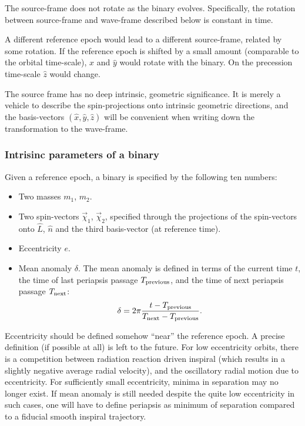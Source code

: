 \documentclass[11pt,tightenlines,article,amssymb,amsmath,amsfonts,superscriptaddress,nofootinbib]{revtex4}
\newcommand{\nNR}{\hat{n}}
\newcommand{\lNR}{\hat L}
\newcommand{\ExS}{{{\hat x}}}
\newcommand{\EyS}{{{\hat y}}}
\newcommand{\EzS}{{{\hat z}}}
\newcommand{\meanAnomaly}{\delta} %
\begin{document}
The source-frame does not rotate as the binary evolves.  Specifically,
the rotation between source-frame and wave-frame described below is
constant in time.

A different reference epoch would lead to a different source-frame,
related by some rotation.  If the reference epoch is shifted by a
small amount (comparable to the orbital time-scale), $\ExS$ and $\EyS$
would rotate with the binary.  On the precession time-scale $\EzS$
would change.


The source frame has no deep intrinsic, geometric significance.  It is
merely a vehicle to describe the spin-projections onto intrinsic
geometric directions, and the basis-vectors $(\ExS, \EyS, \EzS)$ will
be convenient when writing down the transformation to the wave-frame.


\subsubsection{Intrisinc parameters of a binary}

Given a reference epoch, a binary is specified by the following ten
numbers:
\begin{itemize}
\item Two masses $m_1$, $m_2$.
\item Two spin-vectors $\vec\chi_1$, $\vec\chi_2$, specified through 
   the projections of the spin-vectors onto $\lNR$, $\nNR$
  and the third basis-vector (at reference time).
\item Eccentricity $e$.
\item Mean anomaly $\meanAnomaly$.  The mean anomaly is defined in terms of the current time $t$, the time of last periapsis passage $T_{\rm previous}$, and the time of next periapsis passage $T_{\rm next}$: 
\begin{equation}
\label{eq:anomaly}
\meanAnomaly=2\pi\frac{t-T_{\rm previous}}{T_{\rm next}-T_{\rm previous}}.
\end{equation}
\end{itemize}
Eccentricity should be defined somehow ``near'' the reference epoch.
A precise definition (if possible at all) is left to the future.  For
low eccentricity orbits, there is a competition between radiation
reaction driven inspiral (which results in a slightly negative average
radial velocity), and the oscillatory radial motion due to
eccentricity.  For sufficiently small eccentricity, minima in
separation may no longer exist.  If mean anomaly is still needed
despite the quite low eccentricity in such cases, one will have to
define periapsis as minimum of separation compared to a fiducial
smooth inspiral trajectory. 
\end{document}

